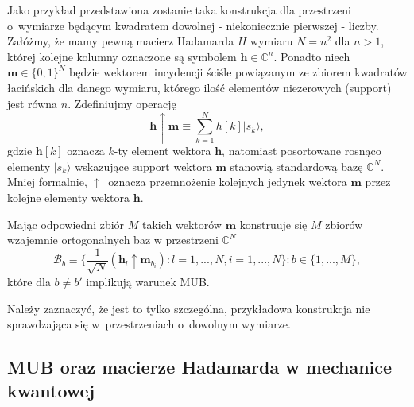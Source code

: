 \documentclass[a4paper,12pt,twoside]{article}
\begin{document}
Jako przyk{\l}ad przedstawiona zostanie taka konstrukcja dla przestrzeni o~wymiarze b\k{e}d\k{a}cym kwadratem dowolnej - niekoniecznie pierwszej - liczby. Za{\l}\'{o}\.{z}my, \.{z}e mamy pewn\k{a} macierz Hadamarda $H$ wymiaru $N=n^2$ dla $n>1$, kt\'{o}rej kolejne kolumny oznaczone s\k{a} symbolem $\textbf{h}\in\mathbb{C}^n$. Ponadto niech $\textbf{m} \in \{0, 1\}^N$ b\k{e}dzie wektorem incydencji \'{s}ci\'{s}le powi\k{a}zanym ze zbiorem kwadrat\'{o}w {\l}aci\'{n}skich dla danego wymiaru, kt\'{o}rego ilo\'{s}\'{c} element\'{o}w niezerowych (support) jest r\'{o}wna $n$. Zdefiniujmy operacj\k{e}~\cite{WB04}
\begin{equation}
\textbf{h} \uparrow \textbf{m} \equiv \sum_{k=1}^N h[k] |s_k\rangle,
\end{equation}
gdzie $\textbf{h}[k]$ oznacza $k$-ty element wektora $\textbf{h}$, natomiast posortowane rosn\k{a}co elementy $|s_k\rangle$ wskazuj\k{a}ce support wektora $\textbf{m}$ stanowi\k{a} standardow\k{a} baz\k{e} $\mathbb{C}^N$. Mniej formalnie, $\uparrow$~oznacza przemno\.{z}enie kolejnych jedynek wektora $\textbf{m}$ przez kolejne elementy wektora $\textbf{h}$.

Maj\k{a}c odpowiedni zbi\'{o}r $M$ takich wektor\'{o}w $\textbf{m}$ konstruuje si\k{e} $M$ zbior\'{o}w wzajemnie ortogonalnych baz w przestrzeni $\mathbb{C}^N$
\begin{equation}
\mathcal{B}_b \equiv \Big\{\frac{1}{\sqrt{N}}(\textbf{h}_l \uparrow \textbf{m}_{b_i}) : l = 1,...,N,i=1,...,N \Big\} : b\in\{1,...,M\},
\end{equation}
kt\'{o}re dla $b\neq b'$ implikuj\k{a} warunek MUB.

Nale\.{z}y zaznaczy\'{c}, \.{z}e jest to tylko szczeg\'{o}lna, przyk{\l}adowa konstrukcja nie spraw\-dza\-j\k{a}\-ca
si\k{e} w~przestrzeniach o~dowolnym wymiarze.

\subsection*{MUB oraz macierze Hadamarda w mechanice kwantowej}
\end{document}
